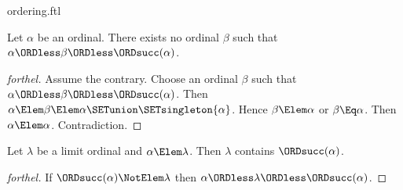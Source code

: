 \documentclass{stex}
\begin{document}
\begin{smodule}{ordering.ftl}
\begin{proposition}[forthel,id=SET_THEORY_02_4240355610329088]
  Let $\alpha$ be an ordinal.
  There exists no ordinal $\beta$ such that $\alpha \ORDless \beta \ORDless \ORDsucc(\alpha)$.
\end{proposition}
\begin{proof}[forthel]
  Assume the contrary.
  Choose an ordinal $\beta$ such that $\alpha \ORDless \beta \ORDless \ORDsucc(\alpha)$.
  Then $\alpha \Elem \beta \Elem \alpha \SETunion \SETsingleton{\alpha}$.
  Hence $\beta \Elem \alpha$ or $\beta \Eq \alpha$.
  Then $\alpha \Elem \alpha$.
  Contradiction.
\end{proof}

\begin{proposition}[forthel,id=SET_THEORY_02_4659024620421120]
  Let $\lambda$ be a limit ordinal and $\alpha \Elem \lambda$.
  Then $\lambda$ contains $\ORDsucc(\alpha)$.
\end{proposition}
\begin{proof}[forthel]
  If $\ORDsucc(\alpha) \NotElem \lambda$ then $\alpha \ORDless \lambda \ORDless \ORDsucc(\alpha)$.
\end{proof}
\end{smodule}
\end{document}
